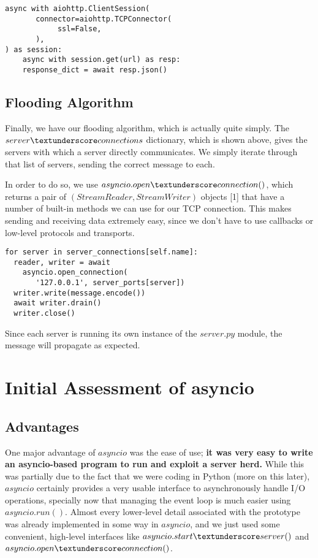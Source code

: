 \begin{verbatim}
async with aiohttp.ClientSession(
       connector=aiohttp.TCPConnector(
            ssl=False,
       ),
) as session:
	async with session.get(url) as resp:
	response_dict = await resp.json()
\end{verbatim}

\subsection{Flooding Algorithm}
Finally, we have our flooding algorithm, which is actually quite simply. The $server\textunderscore connections$
dictionary, which is shown above, gives the servers with which a server directly communicates.
We simply iterate through that list of servers, sending the correct message to each. 

In order to do so,
we use $asyncio.open\textunderscore connection()$, which returns a pair of $(StreamReader, StreamWriter)$ objects [1] that have a number 
of built-in methods we can use for our TCP connection. This makes sending and receiving data extremely easy, 
since we don't have to use callbacks or low-level protocols and transports.

\begin{verbatim}
for server in server_connections[self.name]:
  reader, writer = await 
    asyncio.open_connection(
       '127.0.0.1', server_ports[server])
  writer.write(message.encode())
  await writer.drain()
  writer.close()
\end{verbatim}

Since each server is running its own instance of the $server.py$ module, the message will propagate as expected. 

\section{Initial Assessment of asyncio}

\subsection{Advantages}
One major advantage of $asyncio$ was the ease of use; \textbf {it was very easy to write an asyncio-based 
program to run and exploit a server herd.}
While this was partially due to the fact that we were coding in Python
(more on this later), $asyncio$ certainly provides a very usable interface to asynchronously handle I/O operations, 
specially now that managing the event loop is much easier using $asyncio.run()$.  Almost 
every lower-level detail associated with the prototype was already implemented in some way in $asyncio$, and we just
used some convenient, high-level interfaces like $asyncio.start\textunderscore server()$ and $asyncio.open\textunderscore connection()$. 

